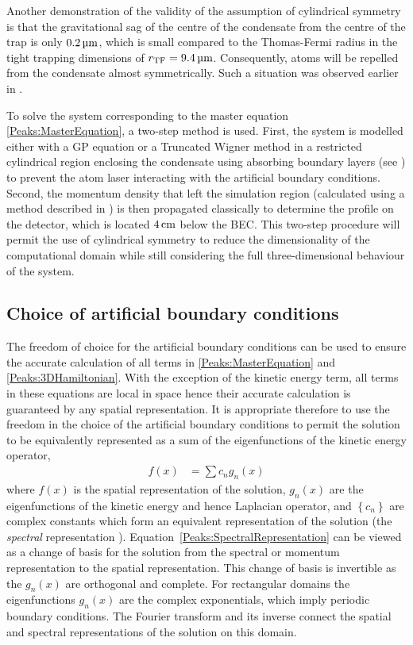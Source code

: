 Another demonstration of the validity of the assumption of cylindrical symmetry is that the gravitational sag of the centre of the condensate from the centre of the trap is only $\unit[0.2]{\micro m}$, which is small compared to the Thomas-Fermi radius in the tight trapping dimensions of $r_\text{TF} = \unit[9.4]{\micro m}$. Consequently, atoms will be repelled from the condensate almost symmetrically. Such a situation was observed earlier in .

To solve the system corresponding to the master equation \eqref{Peaks:MasterEquation}, a two-step method is used. First, the system is modelled either with a GP equation or a Truncated Wigner method in a restricted cylindrical region enclosing the condensate using absorbing boundary layers (see ) to prevent the atom laser interacting with the artificial boundary conditions. Second, the momentum density that left the simulation region (calculated using a method described in ) is then propagated classically to determine the profile on the detector, which is located $\unit[4]{cm}$ below the BEC. This two-step procedure will permit the use of cylindrical symmetry to reduce the dimensionality of the computational domain while still considering the full three-dimensional behaviour of the system.

\subsection{Choice of artificial boundary conditions}

The freedom of choice for the artificial boundary conditions can be used to ensure the accurate calculation of all terms in \eqref{Peaks:MasterEquation} and \eqref{Peaks:3DHamiltonian}. With the exception of the kinetic energy term, all terms in these equations are local in space hence their accurate calculation is guaranteed by any spatial representation. It is appropriate therefore to use the freedom in the choice of the artificial boundary conditions to permit the solution to be equivalently represented as a sum of the eigenfunctions of the kinetic energy operator,
\begin{align}
    \label{Peaks:SpectralRepresentation}
    f(x) &= \sum c_n g_n (x)
\end{align} 
where $f(x)$ is the spatial representation of the solution, $g_n(x)$ are the eigenfunctions of the kinetic energy and hence Laplacian operator, and $\left\{c_n\right\}$ are complex constants which form an equivalent representation of the solution (the \emph{spectral} representation \citep{SpectralMethods}). Equation~\eqref{Peaks:SpectralRepresentation} can be viewed as a change of basis for the solution from the spectral or momentum representation to the spatial representation. This change of basis is invertible as the $g_n(x)$ are orthogonal and complete. For rectangular domains the eigenfunctions $g_n(x)$ are the complex exponentials, which imply periodic boundary conditions. The Fourier transform and its inverse connect the spatial and spectral representations of the solution on this domain.

